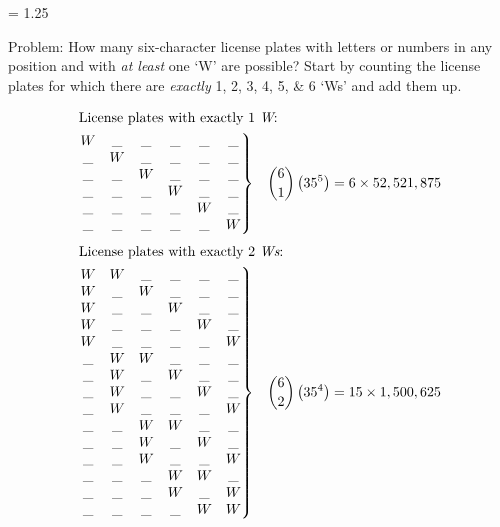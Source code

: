 \documentclass[12pt]{exam}%
\numberwithin{equation}{section}%
\begin{document}

\baselineskip = 1.25\baselineskip %


Problem: How many six-character license plates with letters or
numbers in any position and with {\em at least} one `W' are
possible? Start by counting the license plates for which there are
{\em exactly} 1, 2, 3, 4, 5, \& 6 `Ws' and add them up.

\begin{align*}
 \intertext{License plates with exactly 1 {\em W}:}
 \left.\begin{matrix}
 W&\_&\_&\_&\_&\_\\
 \_&W&\_&\_&\_&\_\\
 \_&\_&W&\_&\_&\_\\
 \_&\_&\_&W&\_&\_\\
 \_&\_&\_&\_&W&\_\\
 \_&\_&\_&\_&\_&W\\
 \end{matrix}\right\} && \binom{6}{1} \left(35 ^ 5 \right) = 6 \times 52,521,875
\end{align*}
\begin{align*}
 \intertext{License plates with exactly 2 {\em Ws}:}
 \left.\begin{matrix}
 W&W&\_&\_&\_&\_\\
 W&\_&W&\_&\_&\_\\
 W&\_&\_&W&\_&\_\\
 W&\_&\_&\_&W&\_\\
 W&\_&\_&\_&\_&W\\
 \_&W&W&\_&\_&\_\\
 \_&W&\_&W&\_&\_\\
 \_&W&\_&\_&W&\_\\
 \_&W&\_&\_&\_&W\\
 \_&\_&W&W&\_&\_\\
 \_&\_&W&\_&W&\_\\
 \_&\_&W&\_&\_&W\\
 \_&\_&\_&W&W&\_\\
 \_&\_&\_&W&\_&W\\
 \_&\_&\_&\_&W&W\\
 \end{matrix}\right\} && \binom{6}{2} \left(35 ^ 4 \right) = 15 \times 1,500,625 
\end{align*}
\end{document}
